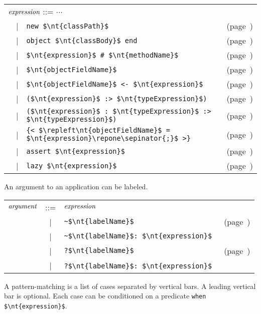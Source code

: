\begin{center}
\begin{tabular}{rcll}
\multicolumn{3}{l}{$\textit{\rmfamily expression}$ ::= $\cdots$}\\
& | & \hbox{\lstinline/new $\nt{classPath}$/} & (page~\pageref{keyword:new})\\
& | & \hbox{\lstinline/object $\nt{classBody}$ end/} & (page~\pageref{keyword:object})\\
& | & \hbox{\lstinline/$\nt{expression}$ # $\nt{methodName}$/} & (page~\pageref{keyword:hash})\\
& | & \hbox{\lstinline/$\nt{objectFieldName}$/} & (page~\pageref{keyword:object})\\
& | & \hbox{\lstinline/$\nt{objectFieldName}$ <- $\nt{expression}$/} & (page~\pageref{keyword:<-(object-field-assignment)})\\
& | & \hbox{\lstinline/($\nt{expression}$ :> $\nt{typeExpression}$)/} & (page~\pageref{keyword::>})\\
& | & \hbox{\lstinline/($\nt{expression}$ : $\nt{typeExpression}$ :> $\nt{typeExpression}$)/} & (page~\pageref{keyword::>})\\
& | & \hbox{\lstinline/{< $\repleft\nt{objectFieldName}$ = $\nt{expression}\repone\sepinator{;}$ >}/} & (page~\pageref{keyword:functional-object-update})\\
& | & \hbox{\lstinline/assert $\nt{expression}$/} & (page~\pageref{keyword:assert})\\
& | & \hbox{\lstinline/lazy $\nt{expression}$/} & (page~\pageref{keyword:lazy})
\end{tabular}
\end{center}
%
An argument to an application can be labeled.

\begin{center}
\begin{tabular}{rcll}
$\textit{\rmfamily argument}$ & ::= & $\textit{\rmfamily expression}$\\
& | & \hbox{\lstinline/~$\nt{labelName}$/} & (page~\pageref{literal:label})\\
& | & \hbox{\lstinline/~$\nt{labelName}$: $\nt{expression}$/}\\
& | & \hbox{\lstinline/?$\nt{labelName}$/} & (page~\pageref{literal:label})\\
& | & \hbox{\lstinline/?$\nt{labelName}$: $\nt{expression}$/}\
\end{tabular}
\end{center}
%
A pattern-matching is a list of cases separated by vertical bars.  A leading vertical bar is optional.
Each case can be conditioned on a predicate \hbox{\lstinline/when $\nt{expression}$/}.

